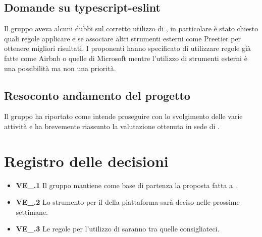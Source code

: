 \subsection{Domande su typescript-eslint}
Il gruppo aveva alcuni dubbi sul corretto utilizzo di , in particolare è stato chiesto quali regole applicare e se associare altri strumenti esterni come Preetier per ottenere migliori risultati. I proponenti hanno specificato di utilizzare regole già fatte come Airbnb o quelle di Microsoft mentre l'utilizzo di strumenti esterni è una possibilità ma non una priorità.
\subsection{Resoconto andamento del progetto}
Il gruppo ha riportato come intende proseguire con lo svolgimento delle varie attività e ha brevemente riassunto la valutazione ottenuta in sede di . 

\section{Registro delle decisioni}
\begin{itemize}
	\item \textbf{VE\_\Data.1} Il gruppo mantiene come base di partenza la proposta fatta a \Proponente.
   \item \textbf{VE\_\Data.2} Lo strumento per il  della piattaforma sarà deciso nelle prossime settimane.
   \item \textbf{VE\_\Data.3} Le regole per l'utilizzo di  saranno tra quelle consigliateci.
\end{itemize}